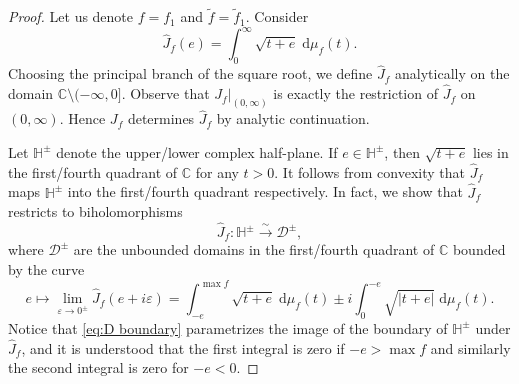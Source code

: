 \documentclass[10pt,a4paper]{amsart}
\newcommand{\CD}{\mathcal{D}}
\newcommand{\C}{\mathbb{C}}
\newcommand{\dif}{\mathrm{d}}
\newcommand{\wh}{\widehat}
\newcommand{\wt}{\widetilde}
\renewcommand{\epsilon}{\varepsilon}
\begin{document}
\begin{proof}
\medskip

	Let us denote $f = f_1$ and $\wt f = \wt f_1$. Consider
	\begin{equation*}
		\wh J_{f}(e) = \int_0^\infty \sqrt{t + e} \; \dif \mu_f(t).
	\end{equation*}
	Choosing the principal branch of the square root, we define $\wh J_f$ analytically on the domain $\C \setminus (-\infty, 0]$.
	Observe that $J_f|_{(0, \infty)}$ is exactly the restriction of $\wh J_f$ on $(0, \infty)$.
	Hence $J_f$ determines $\wh J_f$  by analytic continuation.

\medskip

	Let $\mathbb{H}^\pm$ denote the upper/lower complex half-plane. 
	If $e \in \mathbb{H}^\pm$, then $\sqrt{t + e}$ lies in the first/fourth quadrant of $\C$ for any $t > 0$. It follows from convexity that $\wh J_f$ maps $\mathbb{H}^\pm$ into the first/fourth quadrant respectively.
	In fact, we show that $\wh J_f$ restricts to biholomorphisms
	\begin{equation}\label{eq:hat J bihol}
		\wh J_f: \mathbb{H}^\pm \xrightarrow{\sim} \CD^\pm,
	\end{equation}
	where $\CD^\pm$ are the unbounded domains in the first/fourth quadrant of $\C$ bounded by the curve 
	\begin{equation}\label{eq:D boundary}
		e \mapsto \lim_{\epsilon \to 0^\pm}\wh J_f (e + i \epsilon) = \int_{-e}^{\max f} \sqrt{t + e} \; \dif \mu_f(t) \pm i \int_{0}^{-e} \sqrt{|t + e|}\; \dif \mu_f(t).
	\end{equation}
	Notice that \eqref{eq:D boundary} parametrizes the image of the boundary of $\mathbb{H}^\pm$ under $\wh J_f$, and it is understood that the first integral is zero if $-e > \max f$ and similarly the second integral is zero for $-e < 0$.

\medskip


\end{proof}
\end{document}
